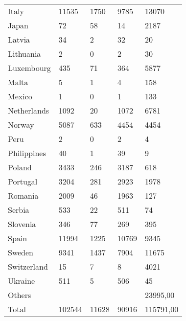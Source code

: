 \begin{table}[]
\begin{tabular}{lllll}
Italy       & 11535        & 1750         & 9785                 & 13070               \\
Japan       & 72           & 58           & 14                   & 2187                \\
Latvia      & 34           & 2            & 32                   & 20                  \\
Lithuania   & 2            & 0            & 2                    & 30                  \\
Luxembourg  & 435          & 71           & 364                  & 5877                \\
Malta       & 5            & 1            & 4                    & 158                 \\
Mexico      & 1            & 0            & 1                    & 133                 \\
Netherlands & 1092         & 20           & 1072                 & 6781                \\
Norway      & 5087         & 633          & 4454                 & 4454                \\
Peru        & 2            & 0            & 2                    & 4                   \\
Philippines & 40           & 1            & 39                   & 9                   \\
Poland      & 3433         & 246          & 3187                 & 618                 \\
Portugal    & 3204         & 281          & 2923                 & 1978                \\
Romania     & 2009         & 46           & 1963                 & 127                 \\
Serbia      & 533          & 22           & 511                  & 74                  \\
Slovenia    & 346          & 77           & 269                  & 395                 \\
Spain       & 11994        & 1225         & 10769                & 9345                \\
Sweden      & 9341         & 1437         & 7904                 & 11675               \\
Switzerland & 15           & 7            & 8                    & 4021                \\
Ukraine     & 511          & 5            & 506                  & 45                  \\
Others      &              &              &                      & 23995,00            \\
Total       & 102544       & 11628        & 90916                & 115791,00
\end{tabular}
\end{table}